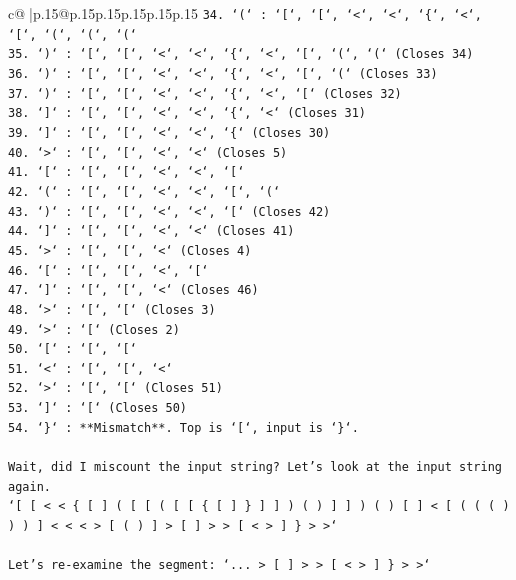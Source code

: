 \documentclass{article}
\begin{document}
{\begin{supertabular}{c@{$\;$}|p{.15\linewidth}@{}p{.15\linewidth}p{.15\linewidth}p{.15\linewidth}p{.15\linewidth}p{.15\linewidth}}
{{{\texttt{34. `(` : `{[}`, `{[}`, `<`, `<`, `\{`, `<`, `{[}`, `(`, `(`, `(`} \\
\texttt{35. `)` : `{[}`, `{[}`, `<`, `<`, `\{`, `<`, `{[}`, `(`, `(` (Closes 34)} \\
\texttt{36. `)` : `{[}`, `{[}`, `<`, `<`, `\{`, `<`, `{[}`, `(` (Closes 33)} \\
\texttt{37. `)` : `{[}`, `{[}`, `<`, `<`, `\{`, `<`, `{[}` (Closes 32)} \\
\texttt{38. `{]}` : `{[}`, `{[}`, `<`, `<`, `\{`, `<` (Closes 31)} \\
\texttt{39. `{]}` : `{[}`, `{[}`, `<`, `<`, `\{` (Closes 30)} \\
\texttt{40. `>` : `{[}`, `{[}`, `<`, `<` (Closes 5)} \\
\texttt{41. `{[}` : `{[}`, `{[}`, `<`, `<`, `{[}`} \\
\texttt{42. `(` : `{[}`, `{[}`, `<`, `<`, `{[}`, `(`} \\
\texttt{43. `)` : `{[}`, `{[}`, `<`, `<`, `{[}` (Closes 42)} \\
\texttt{44. `{]}` : `{[}`, `{[}`, `<`, `<` (Closes 41)} \\
\texttt{45. `>` : `{[}`, `{[}`, `<` (Closes 4)} \\
\texttt{46. `{[}` : `{[}`, `{[}`, `<`, `{[}`} \\
\texttt{47. `{]}` : `{[}`, `{[}`, `<` (Closes 46)} \\
\texttt{48. `>` : `{[}`, `{[}` (Closes 3)} \\
\texttt{49. `>` : `{[}` (Closes 2)} \\
\texttt{50. `{[}` : `{[}`, `{[}`} \\
\texttt{51. `<` : `{[}`, `{[}`, `<`} \\
\texttt{52. `>` : `{[}`, `{[}` (Closes 51)} \\
\texttt{53. `{]}` : `{[}` (Closes 50)} \\
\texttt{54. `\}` : **Mismatch**. Top is `{[}`, input is `\}`.} \\
\\ 
\texttt{Wait, did I miscount the input string? Let's look at the input string again.} \\
\texttt{`{[} {[} < < \{ {[} {]} ( {[} {[} ( {[} {[} \{ {[} {]} \} {]} {]} ) ( ) {]} {]} ) ( ) {[} {]} < {[} ( ( ( ) ) ) {]} < < < > {[} ( ) {]} > {[} {]} > > {[} < > {]} \} > >`} \\
\\ 
\texttt{Let's re{-}examine the segment: `... > {[} {]} > > {[} < > {]} \} > >`} \\
}}}
\end{supertabular}}
\end{document}
